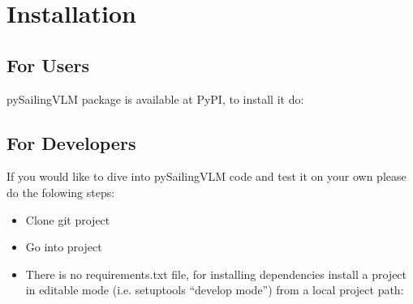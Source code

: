 \documentclass[letterpaper,10pt,english]{jupyterBook}
\begin{document}
\chapter{Installation}
\label{\detokenize{chapters/start/installation:installation}}\label{\detokenize{chapters/start/installation::doc}}

\section{For Users}
\label{\detokenize{chapters/start/installation:for-users}}
\sphinxAtStartPar
pySailingVLM package is available at PyPI, to install it do:

\begin{sphinxVerbatim}[commandchars=\\\{\}]
  
\end{sphinxVerbatim}


\section{For Developers}
\label{\detokenize{chapters/start/installation:for-developers}}
\sphinxAtStartPar
If you would like to dive into pySailingVLM code and test it on your own please do the folowing steps:
\begin{itemize}
\item {} 
\sphinxAtStartPar
Clone git project

\end{itemize}

\begin{sphinxVerbatim}[commandchars=\\\{\}]
  
\end{sphinxVerbatim}
\begin{itemize}
\item {} 
\sphinxAtStartPar
Go into project

\end{itemize}

\begin{sphinxVerbatim}[commandchars=\\\{\}]
 
\end{sphinxVerbatim}
\begin{itemize}
\item {} 
\sphinxAtStartPar
There is no requirements.txt file, for installing dependencies install a project in editable mode (i.e. setuptools “develop mode”) from a local project path:

\end{itemize}
\end{document}
